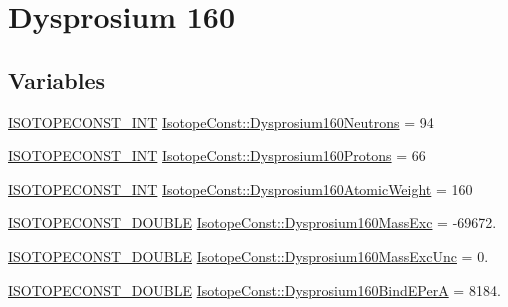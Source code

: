 \hypertarget{group___isotope_const-_dysprosium-_dy160}{}\section{Dysprosium 160}
\label{group___isotope_const-_dysprosium-_dy160}
\subsection*{Variables}
\begin{DoxyCompactItemize}
\item 
\mbox{\hyperlink{group___isotope_const-_macros_ga5f18360b3e99483a35c32d789e62621c}{I\+S\+O\+T\+O\+P\+E\+C\+O\+N\+S\+T\+\_\+\+I\+NT}} \mbox{\hyperlink{group___isotope_const-_dysprosium-_dy160_ga77934c91107d6f22b8bbfb0c4edbe417}{Isotope\+Const\+::\+Dysprosium160\+Neutrons}} = 94
\item 
\mbox{\hyperlink{group___isotope_const-_macros_ga5f18360b3e99483a35c32d789e62621c}{I\+S\+O\+T\+O\+P\+E\+C\+O\+N\+S\+T\+\_\+\+I\+NT}} \mbox{\hyperlink{group___isotope_const-_dysprosium-_dy160_ga3c503660c9e9ce0a345719417b071ec7}{Isotope\+Const\+::\+Dysprosium160\+Protons}} = 66
\item 
\mbox{\hyperlink{group___isotope_const-_macros_ga5f18360b3e99483a35c32d789e62621c}{I\+S\+O\+T\+O\+P\+E\+C\+O\+N\+S\+T\+\_\+\+I\+NT}} \mbox{\hyperlink{group___isotope_const-_dysprosium-_dy160_ga3d854bfb51dd190b17dd3555ffb50e90}{Isotope\+Const\+::\+Dysprosium160\+Atomic\+Weight}} = 160
\item 
\mbox{\hyperlink{group___isotope_const-_macros_ga8f45a7272ce02c0b4c65c44636ed719a}{I\+S\+O\+T\+O\+P\+E\+C\+O\+N\+S\+T\+\_\+\+D\+O\+U\+B\+LE}} \mbox{\hyperlink{group___isotope_const-_dysprosium-_dy160_ga79811352976e2c69f2fc593ac2006248}{Isotope\+Const\+::\+Dysprosium160\+Mass\+Exc}} = -\/69672.
\item 
\mbox{\hyperlink{group___isotope_const-_macros_ga8f45a7272ce02c0b4c65c44636ed719a}{I\+S\+O\+T\+O\+P\+E\+C\+O\+N\+S\+T\+\_\+\+D\+O\+U\+B\+LE}} \mbox{\hyperlink{group___isotope_const-_dysprosium-_dy160_ga3a8d617be28a87a672a2ea35888b9d35}{Isotope\+Const\+::\+Dysprosium160\+Mass\+Exc\+Unc}} = 0.
\item 
\mbox{\hyperlink{group___isotope_const-_macros_ga8f45a7272ce02c0b4c65c44636ed719a}{I\+S\+O\+T\+O\+P\+E\+C\+O\+N\+S\+T\+\_\+\+D\+O\+U\+B\+LE}} \mbox{\hyperlink{group___isotope_const-_dysprosium-_dy160_gac6ba8ec3e04b95963e863887819cd661}{Isotope\+Const\+::\+Dysprosium160\+Bind\+E\+PerA}} = 8184.
\item 

\end{DoxyCompactItemize}
